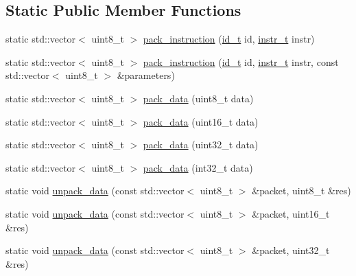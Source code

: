 \subsection*{Static Public Member Functions}
\begin{DoxyCompactItemize}
\item 
static std\+::vector$<$ uint8\+\_\+t $>$ \hyperlink{classdynamixel_1_1protocols_1_1_protocol1_ac2eaf7383aedc5fc0b61d2b84328b4a9}{pack\+\_\+instruction} (\hyperlink{classdynamixel_1_1protocols_1_1_protocol1_a1d4dfa22b01f80b1876d14f539d52b5c}{id\+\_\+t} id, \hyperlink{classdynamixel_1_1protocols_1_1_protocol1_a572dc8c0871ecdf3d62c4f58fbcfd454}{instr\+\_\+t} instr)
\item 
static std\+::vector$<$ uint8\+\_\+t $>$ \hyperlink{classdynamixel_1_1protocols_1_1_protocol1_a2286b86dca486be62e82b9ad9b60cf66}{pack\+\_\+instruction} (\hyperlink{classdynamixel_1_1protocols_1_1_protocol1_a1d4dfa22b01f80b1876d14f539d52b5c}{id\+\_\+t} id, \hyperlink{classdynamixel_1_1protocols_1_1_protocol1_a572dc8c0871ecdf3d62c4f58fbcfd454}{instr\+\_\+t} instr, const std\+::vector$<$ uint8\+\_\+t $>$ \&parameters)
\item 
static std\+::vector$<$ uint8\+\_\+t $>$ \hyperlink{classdynamixel_1_1protocols_1_1_protocol1_a760708ffe05dabe2a6f25b0a5f9a5080}{pack\+\_\+data} (uint8\+\_\+t data)
\item 
static std\+::vector$<$ uint8\+\_\+t $>$ \hyperlink{classdynamixel_1_1protocols_1_1_protocol1_af24d6a0f3565518334ddaff39b562843}{pack\+\_\+data} (uint16\+\_\+t data)
\item 
static std\+::vector$<$ uint8\+\_\+t $>$ \hyperlink{classdynamixel_1_1protocols_1_1_protocol1_a3e69c4c9c6b66571f7771dd46f25e008}{pack\+\_\+data} (uint32\+\_\+t data)
\item 
static std\+::vector$<$ uint8\+\_\+t $>$ \hyperlink{classdynamixel_1_1protocols_1_1_protocol1_af5cd815ec062a17369bc91aac1d88830}{pack\+\_\+data} (int32\+\_\+t data)
\item 
static void \hyperlink{classdynamixel_1_1protocols_1_1_protocol1_ab70c9b89bc4664cdc112dac5e73b9a7f}{unpack\+\_\+data} (const std\+::vector$<$ uint8\+\_\+t $>$ \&packet, uint8\+\_\+t \&res)
\item 
static void \hyperlink{classdynamixel_1_1protocols_1_1_protocol1_a3c5b9e4fed65b82f1db4b7f28684c8bb}{unpack\+\_\+data} (const std\+::vector$<$ uint8\+\_\+t $>$ \&packet, uint16\+\_\+t \&res)
\item 
static void \hyperlink{classdynamixel_1_1protocols_1_1_protocol1_aa1235753ab679394e53a2e5db2d9f443}{unpack\+\_\+data} (const std\+::vector$<$ uint8\+\_\+t $>$ \&packet, uint32\+\_\+t \&res)

\end{DoxyCompactItemize}
